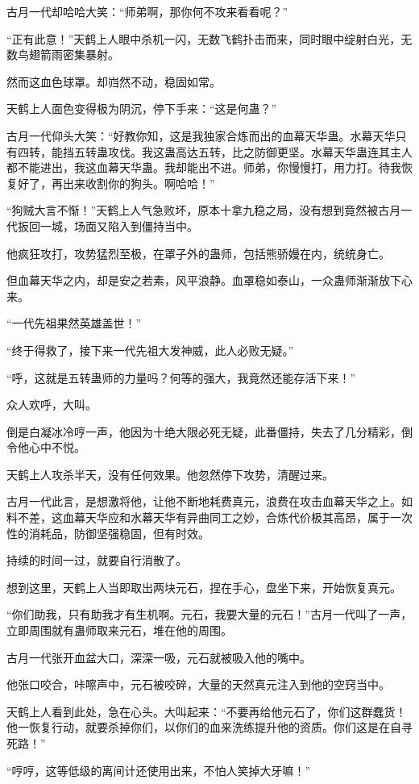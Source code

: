 \begin{this_body}
古月一代却哈哈大笑：“师弟啊，那你何不攻来看看呢？”

“正有此意！”天鹤上人眼中杀机一闪，无数飞鹤扑击而来，同时眼中绽射白光，无数鸟翅箭雨密集暴射。

然而这血色球罩。却岿然不动，稳固如常。

天鹤上人面色变得极为阴沉，停下手来：“这是何蛊？”

古月一代仰头大笑：“好教你知，这是我独家合炼而出的血幕天华蛊。水幕天华只有四转，能挡五转蛊攻伐。我这蛊高达五转，比之防御更坚。水幕天华蛊连其主人都不能进出，我这血幕天华蛊。我却能出不进。师弟，你慢慢打，用力打。待我恢复好了，再出来收割你的狗头。啊哈哈！”

“狗贼大言不惭！”天鹤上人气急败坏，原本十拿九稳之局，没有想到竟然被古月一代扳回一城，场面又陷入到僵持当中。

他疯狂攻打，攻势猛烈至极，在罩子外的蛊师，包括熊骄嫚在内，统统身亡。

但血幕天华之内，却是安之若素，风平浪静。血罩稳如泰山，一众蛊师渐渐放下心来。

“一代先祖果然英雄盖世！”

“终于得救了，接下来一代先祖大发神威，此人必败无疑。”

“呼，这就是五转蛊师的力量吗？何等的强大，我竟然还能存活下来！”

众人欢呼，大叫。

倒是白凝冰冷哼一声，他因为十绝大限必死无疑，此番僵持，失去了几分精彩，倒令他心中不悦。

天鹤上人攻杀半天，没有任何效果。他忽然停下攻势，清醒过来。

古月一代此言，是想激将他，让他不断地耗费真元，浪费在攻击血幕天华之上。如料不差，这血幕天华应和水幕天华有异曲同工之妙，合炼代价极其高昂，属于一次性的消耗品，防御坚强稳固，但有时效。

持续的时间一过，就要自行消散了。

想到这里，天鹤上人当即取出两块元石，捏在手心，盘坐下来，开始恢复真元。

“你们助我，只有助我才有生机啊。元石，我要大量的元石！”古月一代叫了一声，立即周围就有蛊师取来元石，堆在他的周围。

古月一代张开血盆大口，深深一吸，元石就被吸入他的嘴中。

他张口咬合，咔嚓声中，元石被咬碎，大量的天然真元注入到他的空窍当中。

天鹤上人看到此处，急在心头。大叫起来：“不要再给他元石了，你们这群蠢货！他一恢复行动，就要杀掉你们，以你们的血来洗练提升他的资质。你们这是在自寻死路！”

“哼哼，这等低级的离间计还使用出来，不怕人笑掉大牙嘛！”


\end{this_body}
